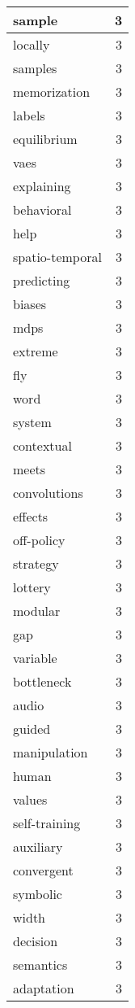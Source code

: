 \begin{table}[h]
\begin{tabular}{|l|r|}
\hline
sample & 3 \\
\hline
locally & 3 \\
\hline
samples & 3 \\
\hline
memorization & 3 \\
\hline
labels & 3 \\
\hline
equilibrium & 3 \\
\hline
vaes & 3 \\
\hline
explaining & 3 \\
\hline
behavioral & 3 \\
\hline
help & 3 \\
\hline
spatio-temporal & 3 \\
\hline
predicting & 3 \\
\hline
biases & 3 \\
\hline
mdps & 3 \\
\hline
extreme & 3 \\
\hline
fly & 3 \\
\hline
word & 3 \\
\hline
system & 3 \\
\hline
contextual & 3 \\
\hline
meets & 3 \\
\hline
convolutions & 3 \\
\hline
effects & 3 \\
\hline
off-policy & 3 \\
\hline
strategy & 3 \\
\hline
lottery & 3 \\
\hline
modular & 3 \\
\hline
gap & 3 \\
\hline
variable & 3 \\
\hline
bottleneck & 3 \\
\hline
audio & 3 \\
\hline
guided & 3 \\
\hline
manipulation & 3 \\
\hline
human & 3 \\
\hline
values & 3 \\
\hline
self-training & 3 \\
\hline
auxiliary & 3 \\
\hline
convergent & 3 \\
\hline
symbolic & 3 \\
\hline
width & 3 \\
\hline
decision & 3 \\
\hline
semantics & 3 \\
\hline
adaptation & 3 \\

\end{tabular}
\end{table}
